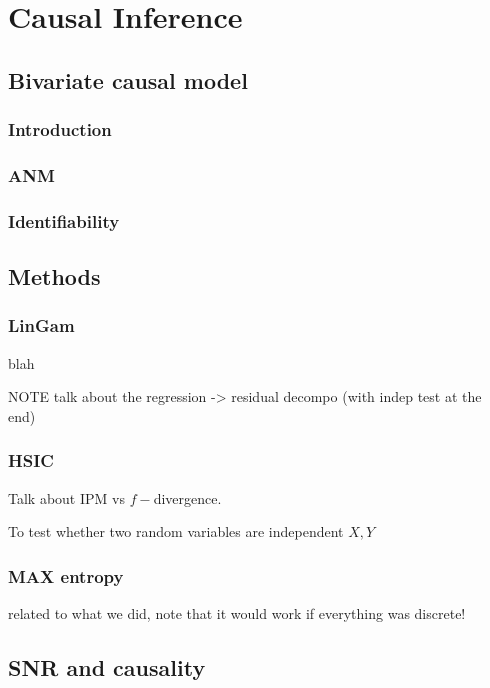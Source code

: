 \chapter{Causal Inference}

\section{Bivariate causal model}

\subsection{Introduction}

\subsection{ANM}

\subsection{Identifiability}


\section{Methods}

\subsection{LinGam}

blah

NOTE talk about the regression -> residual decompo (with indep test at the end)

\subsection{HSIC}

Talk about IPM vs $f-$divergence. 

To test whether two random variables are independent $X, Y$

\subsection{MAX entropy}

related to what we did, note that it would work if everything was discrete!



\section{SNR and causality}


